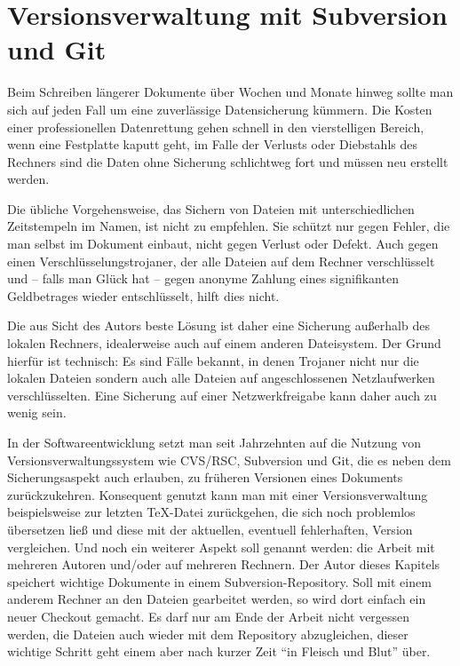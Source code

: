 \chapter{Versionsverwaltung mit Subversion und Git}

Beim Schreiben längerer Dokumente über Wochen und Monate hinweg sollte man sich auf jeden Fall um eine zuverlässige Datensicherung kümmern. Die Kosten einer professionellen Datenrettung gehen schnell in den vierstelligen Bereich, wenn eine Festplatte kaputt geht, im Falle der Verlusts oder Diebstahls des Rechners sind die Daten ohne Sicherung schlichtweg fort und müssen neu erstellt werden.

Die übliche Vorgehensweise, das Sichern von Dateien mit unterschiedlichen Zeitstempeln im Namen, ist nicht zu empfehlen. Sie schützt nur gegen Fehler, die man selbst im Dokument einbaut, nicht gegen Verlust oder Defekt. Auch gegen einen Verschlüsselungstrojaner, der alle Dateien auf dem Rechner verschlüsselt und -- falls man Glück hat -- gegen anonyme Zahlung eines signifikanten Geldbetrages wieder entschlüsselt, hilft dies nicht.

Die aus Sicht des Autors beste Lösung ist daher eine Sicherung außerhalb des lokalen Rechners, idealerweise auch auf einem anderen Dateisystem. Der Grund hierfür ist technisch: Es sind Fälle bekannt, in denen Trojaner nicht nur die lokalen Dateien sondern auch alle Dateien auf angeschlossenen Netzlaufwerken verschlüsselten. Eine Sicherung auf einer Netzwerkfreigabe kann daher auch zu wenig sein. 

In der Softwareentwicklung setzt man seit Jahrzehnten auf die Nutzung von Versionsverwaltungssystem wie CVS/RSC, Subversion und Git, die es neben dem Sicherungsaspekt auch erlauben, zu früheren Versionen eines Dokuments zurückzukehren. Konsequent genutzt kann man mit einer Versionsverwaltung beispielsweise zur letzten \TeX-Datei zurückgehen, die sich noch problemlos übersetzen ließ und diese mit der aktuellen, eventuell fehlerhaften, Version vergleichen. Und noch ein weiterer Aspekt soll genannt werden: die Arbeit mit mehreren Autoren und/oder auf mehreren Rechnern. Der Autor dieses Kapitels speichert wichtige Dokumente in einem Subversion-Repository. Soll mit einem anderem Rechner an den Dateien gearbeitet werden, so wird dort einfach ein neuer Checkout gemacht. Es darf nur am Ende der Arbeit nicht vergessen werden, die Dateien auch wieder mit dem Repository abzugleichen, dieser wichtige Schritt geht einem aber nach kurzer Zeit \enquote{in Fleisch und Blut} über.

